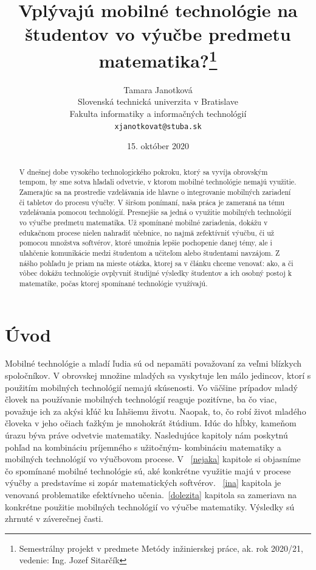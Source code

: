 \documentclass[10pt,twoside,slovak,a4paper]{article}
\title{Vplývajú mobilné technológie na študentov vo výučbe predmetu matematika?\thanks{Semestrálny projekt v predmete Metódy inžinierskej práce, ak. rok 2020/21, vedenie: Ing. Jozef Sitarčík}} %
\author{Tamara Janotková\\[2pt]
	{\small Slovenská technická univerzita v Bratislave}\\
	{\small Fakulta informatiky a informačných technológií}\\
	{\small \texttt{xjanotkovat@stuba.sk}}
	}
\date{\small 15. október 2020} %
\begin{document}
\maketitle

\begin{abstract}
V dnešnej dobe vysokého technologického pokroku, ktorý sa vyvíja obrovským tempom, by sme sotva hľadali odvetvie, v ktorom mobilné technológie nemajú využitie. Zamerajúc sa na prostredie vzdelávania ide hlavne o integrovanie mobilných zariadení či tabletov do procesu výučby. V širšom ponímaní, naša práca je zameraná na tému vzdelávania pomocou technológií. Presnejšie sa jedná o využitie mobilných technológií vo výučbe predmetu matematika. Už spomínané mobilné zariadenia, dokážu v edukačnom procese nielen nahradiť učebnice, no najmä zefektívniť výučbu, či už pomocou množstva softvérov, ktoré umožnia lepšie pochopenie danej témy, ale i uľahčenie komunikácie medzi študentom a učiteľom alebo študentami navzájom. Z nášho pohľadu je priam na mieste otázka, ktorej sa v článku chceme venovať: ako, a či vôbec dokážu technológie ovplyvniť študijné výsledky študentov a ich osobný postoj k matematike, počas ktorej spomínané technológie využívajú. 
\end{abstract}



\section{Úvod}

Mobilné technológie a mladí ľudia sú od nepamäti považovaní za veľmi blízkych spoločníkov. V obrovskej množine mladých sa vyskytuje len málo jedincov, ktorí s použitím mobilných technológií nemajú skúsenosti. Vo väčšine prípadov mladý človek na používanie mobilných technológií reaguje pozitívne, ba čo viac, považuje ich za akýsi kľúč ku ľahšiemu životu. Naopak, to, čo robí život mladého človeka v jeho očiach ťažkým je mnohokrát štúdium. Idúc do hĺbky, kameňom úrazu býva práve odvetvie matematiky. Nasledujúce kapitoly nám poskytnú pohľad na kombináciu príjemného s užitočným- kombináciu matematiky a mobilných technológií vo výučbovom procese. V ~\ref{nejaka} kapitole si objasníme čo spomínané mobilné technológie sú, aké konkrétne využitie majú v procese výučby a predstavíme si zopár matematických softvérov. ~\ref{ina} kapitola je venovaná problematike efektívneho učenia.~\ref{dolezita} kapitola sa zameriava na konkrétne použitie mobilných technológií vo výučbe matematiky. Výsledky sú zhrnuté v záverečnej časti.
\end{document}
